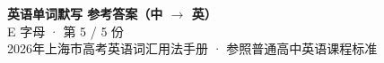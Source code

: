 \documentclass[10pt,a4paper]{article}
\begin{document}
\pagestyle{plain}

\begin{center}
{\LARGE\bfseries 英语单词默写 \quad 参考答案（中 $\to$ 英）}\\[0.22em]
{\large E 字母 · 第 5 / 5 份}\\[0.18em]
{\small 2026年上海市高考英语词汇用法手册 · 参照普通高中英语课程标准}
\end{center}

\vspace{0.2em}
\noindent{\color{rulegray}\rule{\textwidth}{0.8pt}}

\vspace{0.35em}

\vspace{0.25em}
\renewcommand{\arraystretch}{1.32}
\end{document}
